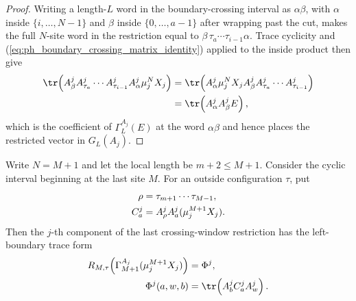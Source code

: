 \begin{proof}
    \leanok
    Writing a length-$L$ word in the boundary-crossing interval as
    $\alpha\beta$, with $\alpha$ inside
    $\{i,\ldots,N-1\}$ and $\beta$ inside $\{0,\ldots,a-1\}$ after wrapping
    past the cut, makes the full $N$-site word in the restriction equal to
    $\beta\,\tau_a\cdots\tau_{i-1} \alpha$. Trace cyclicity and
    (\ref{eq:ph_boundary_crossing_matrix_identity}) applied to the inside
    product then give
    \begin{align}
        \tr\!\left(A^j_\beta A^j_{\tau_a}\cdots A^j_{\tau_{i-1}}
        A^j_\alpha \mu_j^NX_j\right)
         & =
        \tr\!\left(A^j_\alpha \mu_j^NX_j A^j_\beta
        A^j_{\tau_a}\cdots A^j_{\tau_{i-1}}\right) \notag \\
         & =
        \tr\!\left(A^j_\alpha A^j_\beta E\right),
        \notag
    \end{align}
    which is the coefficient of $\Gamma_L^{A_j}(E)$ at the word $\alpha\beta$
    and hence places the restricted vector in $G_L(A_j)$.
\end{proof}

\begin{lemma}
    \label{lem:block_diagonal_last_crossing_component_trace_form}
    \leanok
    Write $N=M+1$ and let the local length be $m+2\le M+1$. Consider the
    cyclic interval beginning at the last site $M$. For an outside
    configuration $\tau$, put
    \begin{align}
        \rho
         & =\tau_{m+1}\cdots\tau_{M-1},
        \notag                              \\
        C^j_a
         & =A^j_\rho A^j_a(\mu_j^{M+1}X_j).
        \notag
    \end{align}
    Then the $j$-th component of the last crossing-window restriction has
    the left-boundary trace form
    \begin{align}
        R_{M,\tau}\!\left(\Gamma_{M+1}^{A_j}(\mu_j^{M+1}X_j)\right)
         & =
        \Phi^j,
        \notag \\
        \Phi^j(a,w,b)
         & =
        \tr\!\left(A^j_b C^j_a A^j_w\right).
        \notag
    \end{align}
\end{lemma}

